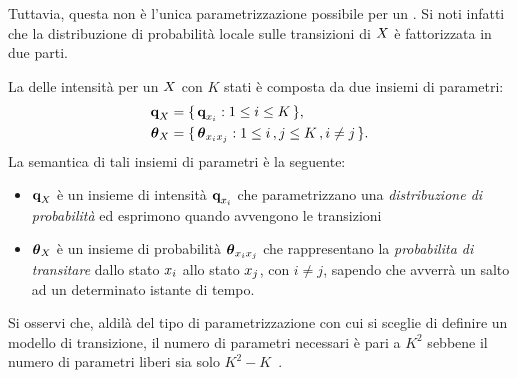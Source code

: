 Tuttavia, questa non è l'unica parametrizzazione possibile per un \mprocess*{} \omog*{}. Si noti infatti che la distribuzione di probabilità locale sulle transizioni di $\mathnormal{X}$ è fattorizzata in due parti.
\begin{definizione}\label{defn:mixed-parametrization}
La \emph{} delle intensità per un \mprocess*{} \omog*{} $\mathnormal{X}$ con $K$ stati è composta da due insiemi di parametri:
\begin{equation}
\begin{split}
\boldsymbol{\textbf{\text{q}}}_{\mathnormal{X}} &= \{\, \boldsymbol{\textbf{\text{q}}}_{\mathnormal{x}_i} : 1 \leq i \leq K \,\} \text{,} \nonumber\\
\boldsymbol{\textbf{\text{$\theta$}}}_{\mathnormal{X}} &= \{\, \boldsymbol{\textbf{\text{$\theta$}}}_{\mathnormal{x}_i\mathnormal{x}_j} : 1 \leq i\,,j \leq K\,,i \neq j \,\} \text{.}
\end{split}
\end{equation}
La semantica di tali insiemi di parametri è la seguente:
\begin{itemize}
    \item $\boldsymbol{\textbf{\text{q}}}_{\mathnormal{X}}$ è un insieme di intensità $\boldsymbol{\textbf{\text{q}}}_{\mathnormal{x}_i}$ che parametrizzano una \emph{distribuzione di probabilità } ed esprimono quando avvengono le transizioni
    \item $\boldsymbol{\textbf{\text{$\theta$}}}_{\mathnormal{X}}$ è un insieme di probabilità $\boldsymbol{\textbf{\text{$\theta$}}}_{\mathnormal{x}_i\mathnormal{x}_j}$ che rappresentano la \emph{probabilita di transitare} dallo stato $\mathnormal{x}_i$ allo stato $\mathnormal{x}_j$, con $i \neq j$, sapendo che avverrà un salto ad un determinato istante di tempo.
\end{itemize}
\end{definizione}
\begin{osservazione}
Si osservi che, aldilà del tipo di parametrizzazione con cui si sceglie di definire un modello di transizione, il numero di parametri necessari è pari a $K^2$ sebbene il numero di parametri liberi sia solo $K^2-K$~\citep{Nodelman2007}.
\end{osservazione}
